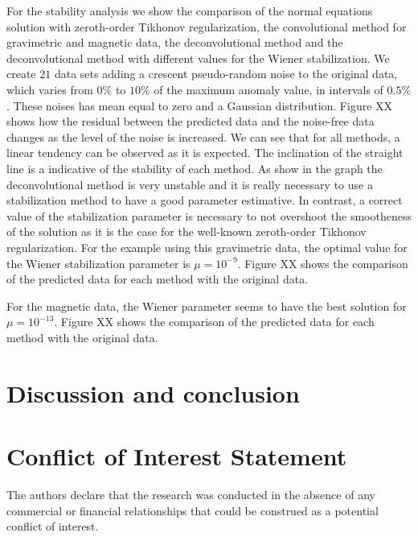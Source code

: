 \documentclass[utf8]{FrontiersinHarvard} %
\begin{document}
For the stability analysis we show the comparison of the normal equations solution with zeroth-order Tikhonov regularization, the convolutional method for gravimetric and magnetic data, the deconvolutional method and the deconvolutional method with different values for the Wiener stabilization. We create $21$ data sets adding a crescent pseudo-random noise to the original data, which varies from $0\%$ to $10\%$ of the maximum anomaly value, in intervals of $0.5\%$. These noises has mean equal to zero and a Gaussian distribution.
Figure XX shows how the residual between the predicted data and the noise-free data changes as the level of the noise is increased. We can see that for all methods, a linear tendency can be observed as it is expected. The inclination of the straight line is a indicative of the stability of each method. As show in the graph the deconvolutional method is very unstable and it is really necessary to use a stabilization method to have a good parameter estimative. In contrast, a correct value of the stabilization parameter is necessary to not overshoot the smootheness of the solution as it is the case for the well-known zeroth-order Tikhonov regularization. For the example using this gravimetric data, the optimal value for the Wiener stabilization parameter is $\mu = 10^{-9}$. Figure XX shows the comparison of the predicted data for each method with the original data.

For the magnetic data, the Wiener parameter seems to have the best solution for $\mu = 10^{-13}$. Figure XX shows the comparison of the predicted data for each method with the original data.

\section{Discussion and conclusion}

\section*{Conflict of Interest Statement}

The authors declare that the research was conducted in the absence of any commercial or financial relationships that could be construed as a potential conflict of interest.
\end{document}

